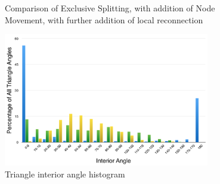 \begin{figure}[h!]
  \begin{center}
  \caption{Comparison of Exclusive Splitting, with addition of Node
Movement, with further addition of local reconnection}
  \label{fig_Combo}
  \end{center}
\end{figure}

\begin{figure}[h!]
  \begin{center}
  \includegraphics[width=90mm]{Figures/MeshQuality.png}
  \caption{Triangle interior angle histogram}
  \label{fig_MeshQuality}
  \end{center}
\end{figure}

